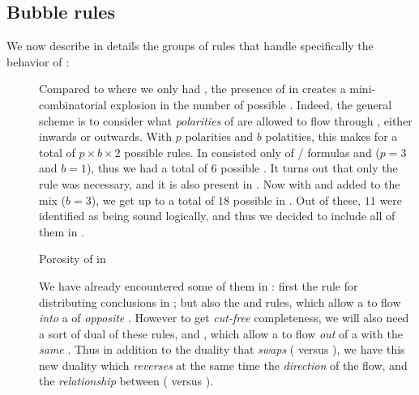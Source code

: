 \subsection{Bubble rules}

We now describe in details the groups of rules that handle specifically the
behavior of :

\begin{description}
  \item[\flow]

  Compared to  where we only had  , the presence of
    in  creates a mini-combinatorial
  explosion in the number of possible . Indeed, the general
  scheme is to consider what \emph{polarities} of  are allowed to flow
  through , either inwards or outwards. With $p$  polarities and
  $b$  polatities, this makes for a total of $p \times b \times 2$
  possible rules. In   consisted only of
  / formulas and   ($p = 3$
  and $b = 1$), thus we had a total of $6$ possible . It turns
  out that only the  rule was necessary, and it is also present in
  . Now with  and   added to
  the mix ($b = 3$), we get up to a total of $18$ possible  in
  . Out of these, $11$ were identified as being sound logically,
  and thus we decided to include all of them in .

  \begin{marginfigure}
    \caption{Porosity of  in }
  \end{marginfigure}
  
  We have already encountered some of them in : first the
   rule for distributing conclusions in ; but also
  the  and  rules, which allow a
    to flow \emph{into} a  of \emph{opposite}
  . However to get \emph{cut-free} completeness, we will also need
  a sort of dual of these rules,  and , which
  allow a   to flow \emph{out} of a  with the
  \emph{same} . Thus in addition to the duality that \emph{swaps}
   ( versus ), we have this new
  duality which \emph{reverses} at the same time the \emph{direction} of the
  flow, and the \emph{relationship} between  (
  versus ).


\end{description}
